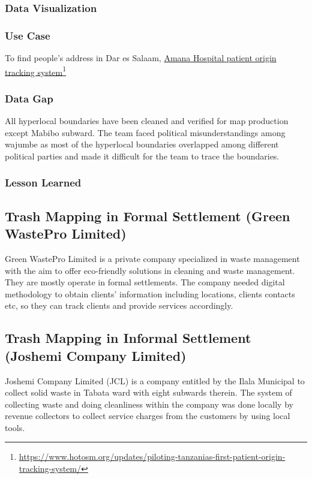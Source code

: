 \documentclass[a4paper,12pt,twoside]{article}
\begin{document}
\subsubsection{Data Visualization}

\subsubsection{Use Case}
To find people’s address in Dar es Salaam, \href{https://www.hotosm.org/updates/piloting-tanzanias-first-patient-origin-tracking-system/}{Amana Hospital patient origin tracking system}\footnote{\url{https://www.hotosm.org/updates/piloting-tanzanias-first-patient-origin-tracking-system/}}

\subsubsection{Data Gap}
All hyperlocal boundaries have been cleaned and verified for map production except Mabibo subward. The team faced political misunderstandings among wajumbe as most of the hyperlocal boundaries overlapped among different political parties and made it difficult for the team to trace the boundaries.

\subsubsection{Lesson Learned}

\newpage
\subsection{Trash Mapping in Formal Settlement (Green WastePro Limited)}
Green WastePro Limited is a private company specialized in waste management with the aim to offer eco-friendly solutions in cleaning and waste management. They are mostly operate in formal settlements. The company needed digital methodology to obtain clients’ information including locations, clients contacts etc, so they can track clients and provide services accordingly.

\newpage
\subsection{Trash Mapping in Informal Settlement (Joshemi Company Limited)}

Joshemi Company Limited (JCL) is a company entitled by the Ilala Municipal to collect solid waste in Tabata ward with eight subwards therein. The system of collecting waste and doing cleanliness within the company was done locally by revenue collectors to collect service charges from the customers by using local tools.
\end{document}
